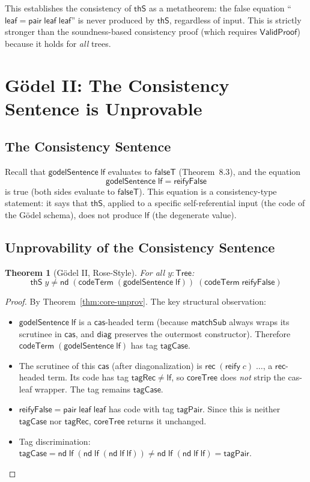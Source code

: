 \documentclass[11pt]{article}
\newtheorem{theorem}{Theorem}
\newcommand{\lf}{\mathsf{lf}}
\newcommand{\nd}{\mathsf{nd}}
\newcommand{\cas}{\mathsf{cas}}
\newcommand{\rec}{\mathsf{rec}}
\newcommand{\reify}{\mathsf{reify}}
\newcommand{\codeTerm}{\mathsf{codeTerm}}
\newcommand{\diag}{\mathsf{diag}}
\newcommand{\thS}{\mathsf{thS}}
\newcommand{\Tree}{\mathsf{Tree}}
\newcommand{\ValidProof}{\mathsf{ValidProof}}
\newcommand{\coreTree}{\mathsf{coreTree}}
\begin{document}
\noindent This establishes the consistency of $\thS$ as a metatheorem:
the false equation ``$\mathsf{leaf} = \mathsf{pair}\;\mathsf{leaf}\;\mathsf{leaf}$''
is never produced by $\thS$, regardless of input. This is strictly stronger than
the soundness-based consistency proof (which requires $\ValidProof$) because
it holds for \emph{all} trees.

\section{G\"odel II: The Consistency Sentence is Unprovable}

\subsection{The Consistency Sentence}

Recall that $\mathsf{godelSentence}\;\lf$ evaluates to $\mathsf{falseT}$
(Theorem~8.3), and the equation
\[
  \mathsf{godelSentence}\;\lf = \mathsf{reifyFalse}
\]
is true (both sides evaluate to $\mathsf{falseT}$). This equation is a
consistency-type statement: it says that $\thS$, applied to a specific
self-referential input (the code of the G\"odel schema), does not produce $\lf$
(the degenerate value).

\subsection{Unprovability of the Consistency Sentence}

\begin{theorem}[G\"odel II, Rose-Style]\label{thm:godel2}
For all $y : \Tree$:
\[
  \thS\;y \neq \nd\;(\codeTerm\;(\mathsf{godelSentence}\;\lf))\;(\codeTerm\;\mathsf{reifyFalse})
\]
\end{theorem}
\begin{proof}
By Theorem~\ref{thm:core-unprov}. The key structural observation:
\begin{itemize}
  \item $\mathsf{godelSentence}\;\lf$ is a $\cas$-headed term (because
    $\mathsf{matchSub}$ always wraps its scrutinee in $\cas$, and
    $\diag$ preserves the outermost constructor). Therefore
    $\codeTerm\;(\mathsf{godelSentence}\;\lf)$ has tag $\mathsf{tagCase}$.
  \item The scrutinee of this $\cas$ (after diagonalization) is
    $\rec\;(\reify\;c)\;\ldots$, a $\rec$-headed term. Its code has tag
    $\mathsf{tagRec} \neq \lf$, so $\coreTree$ does \emph{not} strip the
    cas-leaf wrapper. The tag remains $\mathsf{tagCase}$.
  \item $\mathsf{reifyFalse} = \mathsf{pair}\;\mathsf{leaf}\;\mathsf{leaf}$
    has code with tag $\mathsf{tagPair}$. Since this is neither $\mathsf{tagCase}$
    nor $\mathsf{tagRec}$, $\coreTree$ returns it unchanged.
  \item Tag discrimination: $\mathsf{tagCase} = \nd\;\lf\;(\nd\;\lf\;(\nd\;\lf\;\lf))
    \neq \nd\;\lf\;(\nd\;\lf\;\lf) = \mathsf{tagPair}$.
\end{itemize}
\end{proof}
\end{document}
